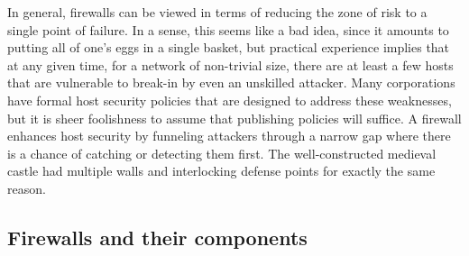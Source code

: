 In general, firewalls can be viewed in terms of reducing the zone of
risk to a single point of failure. In a sense, this seems like a bad
idea, since it amounts to putting all of one's eggs in a single basket,
but practical experience implies that at any given time, for a network
of non-trivial size, there are at least a few hosts that are vulnerable
to break-in by even an unskilled attacker. Many corporations have
formal host security policies that are designed to address these
weaknesses, but it is sheer foolishness to assume that publishing
policies will suffice. A firewall enhances host security by funneling
attackers through a narrow gap where there is a chance of catching or
detecting them first. The well-constructed medieval castle had multiple
walls and interlocking defense points for exactly the same reason.


\subsection{Firewalls and their components}

